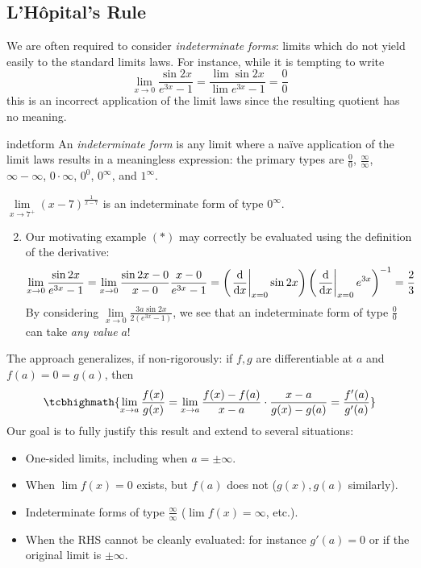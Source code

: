 \goodbreak


\subsection{L'Hôpital's Rule}\label{sec:lhopital}

We are often required to consider \emph{indeterminate forms}: limits which do not yield easily to the standard limits laws. For instance, while it is tempting to write
\[
	\lim_{x\to 0}\frac{\sin 2x}{e^{3x}-1}
	=\frac{\lim\sin 2x}{\lim e^{3x}-1}
	=\frac 00 \tag{$\ast$}
\]
this is an incorrect application of the limit laws since the resulting quotient has no meaning.

\begin{defn}{}{indetform}
	An \emph{indeterminate form} is any limit where a naïve application of the limit laws results in a meaningless expression: the primary types are $\frac 00$, $\frac\infty\infty$, $\infty-\infty$, $0\cdot\infty$, $0^0$, $0^\infty$, and $1^\infty$.
\end{defn}

\begin{examples}{}{}
	\exstart $\lim\limits_{x\to 7^+}(x-7)^\frac 1{x-7}$ is an indeterminate form of type $0^\infty$.
	\begin{enumerate}\setcounter{enumi}{1}
	  \item Our motivating example $(\ast)$ may correctly be evaluated using the definition of the derivative:
		\[
			\lim_{x\to 0}\frac{\sin 2x}{e^{3x}-1}
			=\lim_{x\to 0}\frac{\sin 2x-0}{x-0}\frac{x-0}{e^{3x}-1} 
			=\left(\left.\frac{\mathrm{d} }{\mathrm{d} x}\right|_{x=0}\sin 2x\right) \left(\left.\frac{\mathrm{d} }{\mathrm{d} x}\right|_{x=0}e^{3x}\right)^{-1} 
			=\frac 23
		\]
		By considering $\lim\limits_{x\to 0}\frac{3a\sin 2x}{2(e^{3x}-1)}$, we see that an indeterminate form of type $\frac 00$ can take \emph{any value} $a$!
	\end{enumerate}
\end{examples}

The approach generalizes, if non-rigorously: if $f,g$ are differentiable at $a$ and $f(a)=0=g(a)$, then
\[
	\tcbhighmath{%
		\lim_{x\to a}\frac{f(x)}{g(x)}
		=\lim_{x\to a}\frac{f(x)-f(a)}{x-a}\cdot \frac{x-a}{g(x)-g(a)} 
		=\frac{f'(a)}{g'(a)}
	}
\]
Our goal is to fully justify this result and extend to several situations:
\begin{itemize}\itemsep2pt
  \item One-sided limits, including when $a=\pm\infty$.
  \item When $\lim f(x)=0$ exists, but $f(a)$ does not ($g(x),g(a)$ similarly).
  \item Indeterminate forms of type $\frac\infty\infty$ ($\lim f(x)=\infty$, etc.).
  \item When the RHS cannot be cleanly evaluated: for instance $g'(a)=0$ or if the original limit is $\pm\infty$.
\end{itemize}

